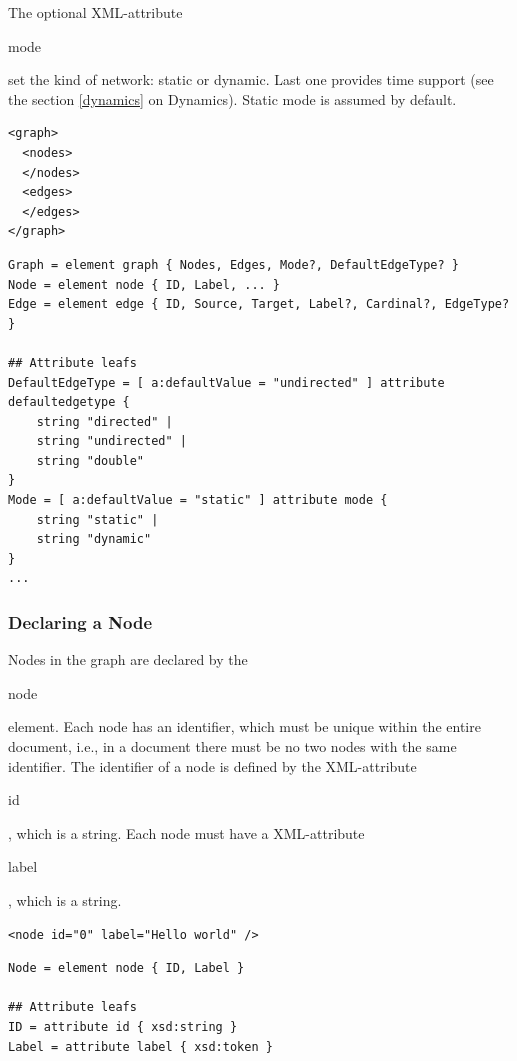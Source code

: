 \documentclass[a4paper,10pt]{article}
\begin{document}
The optional XML-attribute \begin{footnotesize}mode\end{footnotesize} set the kind of network: static or dynamic. Last one provides time support (see  the section \ref{dynamics} on Dynamics). Static mode is assumed by default.

\lstset{ style=gexf }
\begin{lstlisting}[caption={An empty graph!},label=aGraph]
<graph>
  <nodes>
  </nodes>
  <edges>
  </edges>
</graph>
\end{lstlisting}

\lstset{ style=rnc }
\begin{lstlisting}[caption={Topology Specification},label=topologyRNC]
Graph = element graph { Nodes, Edges, Mode?, DefaultEdgeType? }
Node = element node { ID, Label, ... }
Edge = element edge { ID, Source, Target, Label?, Cardinal?, EdgeType? }

## Attribute leafs
DefaultEdgeType = [ a:defaultValue = "undirected" ] attribute defaultedgetype {
    string "directed" |
    string "undirected" |
    string "double"
}
Mode = [ a:defaultValue = "static" ] attribute mode {
    string "static" |
    string "dynamic"
}
...
\end{lstlisting}

\subsubsection{Declaring a Node}

Nodes in the graph are declared by the \begin{footnotesize}node\end{footnotesize} element. Each node has an identifier, which must be unique within the entire document, i.e., in a document there must be no two nodes with the same identifier. The identifier of a node is defined by the XML-attribute \begin{footnotesize}id\end{footnotesize}, which is a string. Each node must have a XML-attribute \begin{footnotesize}label\end{footnotesize}, which is a string.

\lstset{ style=gexf }
\begin{lstlisting}[caption={A node!},label=aNode]
<node id="0" label="Hello world" />
\end{lstlisting}

\lstset{ style=rnc }
\begin{lstlisting}[caption={Node Specification},label=nodeRNC]
Node = element node { ID, Label }

## Attribute leafs
ID = attribute id { xsd:string }
Label = attribute label { xsd:token }
\end{lstlisting}
\end{document}
